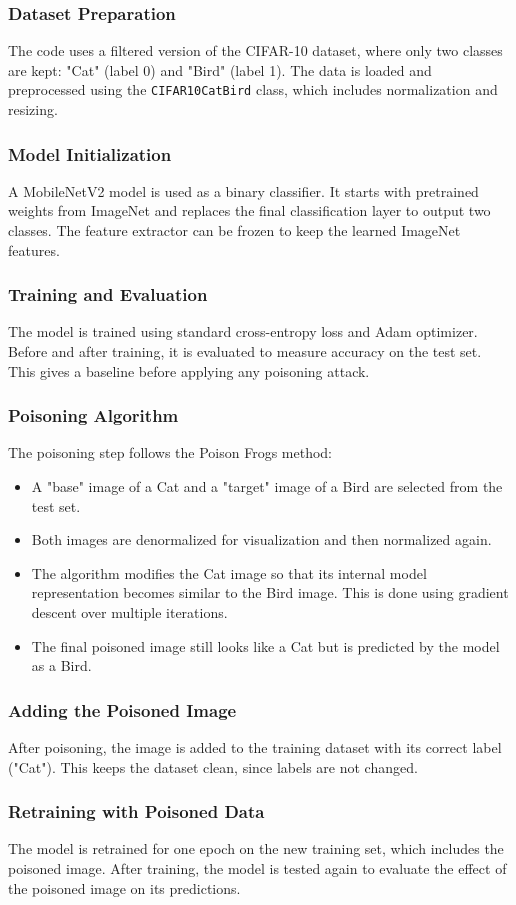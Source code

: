 \subsubsection{Dataset Preparation}
The code uses a filtered version of the CIFAR-10 dataset, where only two classes are kept: "Cat" (label 0) and "Bird" (label 1). The data is loaded and preprocessed using the \texttt{CIFAR10CatBird} class, which includes normalization and resizing.

\subsubsection{Model Initialization}
A MobileNetV2 model is used as a binary classifier. It starts with pretrained weights from ImageNet and replaces the final classification layer to output two classes. The feature extractor can be frozen to keep the learned ImageNet features.

\subsubsection{Training and Evaluation}
The model is trained using standard cross-entropy loss and Adam optimizer. Before and after training, it is evaluated to measure accuracy on the test set. This gives a baseline before applying any poisoning attack.

\subsubsection{Poisoning Algorithm}
The poisoning step follows the Poison Frogs method:

\begin{itemize}
    \item A "base" image of a Cat and a "target" image of a Bird are selected from the test set.
    \item Both images are denormalized for visualization and then normalized again.
    \item The algorithm modifies the Cat image so that its internal model representation becomes similar to the Bird image. This is done using gradient descent over multiple iterations.
    \item The final poisoned image still looks like a Cat but is predicted by the model as a Bird.
\end{itemize}

\subsubsection{Adding the Poisoned Image}
After poisoning, the image is added to the training dataset with its correct label ("Cat"). This keeps the dataset clean, since labels are not changed.

\subsubsection{Retraining with Poisoned Data}
The model is retrained for one epoch on the new training set, which includes the poisoned image. After training, the model is tested again to evaluate the effect of the poisoned image on its predictions.